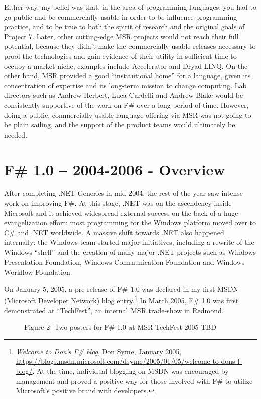\documentclass[acmsmall,review]{acmart}\settopmatter{printfolios=true,printccs=false,printacmref=false}
\begin{document}
Either way, my belief was that, in the area of programming languages, you had to go public and be commercially usable in order to be influence programming practice, and to be true to both the spirit of research and the original goals of Project 7. Later, other cutting-edge MSR projects would not reach their full potential, because they didn’t make the commercially usable releases necessary to proof the technologies and gain evidence of their utility in sufficient time to occupy a market niche, examples include Accelerator and Dryad LINQ. On the other hand, MSR provided a good “institutional home” for a language, given its concentration of expertise and its long-term mission to change computing. Lab directors such as Andrew Herbert, Luca Cardelli and Andrew Blake would be consistently supportive of the work on F\# over a long period of time. However, doing a public, commercially usable language offering via MSR was not going to be plain sailing, and the support of the product teams would ultimately be needed.

\section*{F\# 1.0 – 2004-2006 - Overview}

After completing .NET Generics in mid-2004, the rest of the year saw intense work on improving F\#. At this stage, .NET was on the ascendency inside Microsoft and it achieved widespread external success on the back of a huge evangelization effort: most programming for the Windows platform moved over to C\# and .NET worldwide. A massive shift towards .NET also happened internally: the Windows team started major initiatives, including a rewrite of the Windows “shell” and the creation of many major .NET projects such as Windows Presentation Foundation, Windows Communication Foundation and Windows Workflow Foundation.

On January 5, 2005, a pre-release of F\# 1.0 was declared in my first MSDN (Microsoft Developer Network) blog entry.\footnote{\textit{Welcome to Don’s F\# blog}, Don Syme, January 2005, \url{https://blogs.msdn.microsoft.com/dsyme/2005/01/05/welcome-to-dons-f-blog/}. At the time, individual blogging on MSDN was encouraged by management and proved a positive way for those involved with F\# to utilize Microsoft’s positive brand with developers.}  In March 2005, F\# 1.0 was first demonstrated at “TechFest”, an internal MSR trade-show in Redmond.  

\begin{figure}
Figure 2- Two posters for F\# 1.0 at MSR TechFest 2005
TBD
\end{figure}
\end{document}
